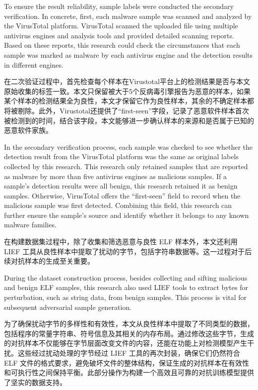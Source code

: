 To ensure the result reliability, sample labels were conducted the secondary verification. In concrete, first, each malware sample was scanned and analyzed by the VirusTotal platform. VirusTotal scanned the uploaded file using multiple antivirus engines and analysis tools and provided detailed scanning reports. Based on these reports, this research could check the circumstances that each sample was marked as malware by each antivirus engine and the detection results in different engines.

在二次验证过程中，首先检查每个样本在Virustotal平台上的检测结果是否与本文原始收集的标签一致。本文只保留被大于5个反病毒引擎报告为恶意的样本，如果某个样本的检测结果全为良性，本文才保留它作为良性样本，其余的不确定样本都将被剔除。此外，Virustotal还提供了“first-seen”字段，记录了恶意软件样本首次被检测到的时间，结合该字段，本文能够进一步确认样本的来源和是否属于已知的恶意软件家族。

In the secondary verification process, each sample was checked to see whether the detection result from the VirusTotal platform was the same as original labels collected by this research. This research only retained samples that are reported as malware by more than five antivirus engines as malicious samples. If a sample's detection results were all benign, this research retained it as benign samples. Otherwise, VirusTotal offers the “first-seen” field to record when the malicious sample was first detected. Combining this field, this research can further ensure the sample's source and identify whether it belongs to any known malware families.

在构建数据集过程中，除了收集和筛选恶意与良性 ELF 样本外，本文还利用 LIEF 工具从良性样本中提取了扰动的字节，包括字符串数据等。这一过程对于后续对抗样本的生成至关重要。

During the dataset construction process, besides collecting and sifting malicious and benign ELF samples, this research also used LIEF tools to extract bytes for perturbation, such as string data, from benign samples. This process is vital for subsequent adversarial sample generation.

为了确保扰动字节的多样性和有效性，本文从良性样本中提取了不同类型的数据，包括程序的常量字符串、符号信息及其相关的内存布局。通过修改这些字节，生成的对抗样本不仅能够在字节层面改变文件的内容，还能在功能上对检测模型产生干扰。这些经过扰动处理的字节经过 LIEF 工具的再次封装，确保它们仍然符合 ELF 文件的格式要求，避免破坏文件的整体结构，保证生成的对抗样本在有效性和可执行性之间保持平衡。此部分操作为构建一个高效且可靠的对抗训练模型提供了坚实的数据支持。

